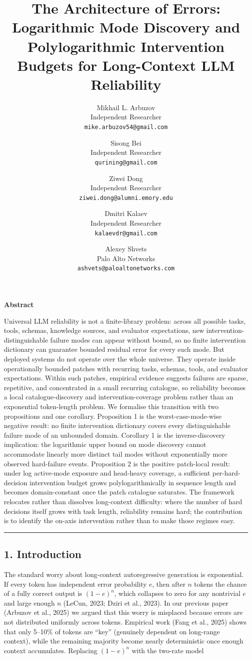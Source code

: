 \documentclass[
]{article}
\author{%
    Mikhail L. Arbuzov\\
    Independent Researcher\\
    \texttt{mike.arbuzov54@gmail.com}
    \and
    Sisong Bei\\
    Independent Researcher\\
    \texttt{qurining@gmail.com}
    \and
    Ziwei Dong\\
    Independent Researcher\\
    \texttt{ziwei.dong@alumni.emory.edu}
    \and
    Dmitri Kalaev\\
    Independent Researcher\\
    \texttt{kalaevdr@gmail.com}
    \and
    Alexey Shvets\\
    Palo Alto Networks\\
    \texttt{ashvets@paloaltonetworks.com}
  }%
\title{The Architecture of Errors: Logarithmic Mode Discovery and
Polylogarithmic Intervention Budgets for Long-Context LLM Reliability}
\author{}
\date{}
\begin{document}
\maketitle

\textbf{Abstract}

Universal LLM reliability is not a finite-library problem: across all
possible tasks, tools, schemas, knowledge sources, and evaluator
expectations, new intervention-distinguishable failure modes can appear
without bound, so no finite intervention dictionary can guarantee
bounded residual error for every such mode. But deployed systems do not
operate over the whole universe. They operate inside operationally
bounded patches with recurring tasks, schemas, tools, and evaluator
expectations. Within such patches, empirical evidence suggests failures
are sparse, repetitive, and concentrated in a small recurring catalogue,
so reliability becomes a local catalogue-discovery and
intervention-coverage problem rather than an exponential token-length
problem. We formalise this transition with two propositions and one
corollary. Proposition 1 is the worst-case-mode-wise negative result: no
finite intervention dictionary covers every distinguishable failure mode
of an unbounded domain. Corollary 1 is the inverse-discovery
implication: the logarithmic upper bound on mode discovery cannot
accommodate linearly more distinct tail modes without exponentially more
observed hard-failure events. Proposition 2 is the positive patch-local
result: under log active-mode exposure and head-heavy coverage, a
sufficient per-hard-decision intervention budget grows
polylogarithmically in sequence length and becomes domain-constant once
the patch catalogue saturates. The framework relocates rather than
dissolves long-context difficulty: where the number of hard decisions
itself grows with task length, reliability remains hard; the
contribution is to identify the on-axis intervention rather than to make
those regimes easy.

\begin{center}\rule{0.5\linewidth}{0.5pt}\end{center}

\subsection{1. Introduction}\label{introduction}

The standard worry about long-context autoregressive generation is
exponential. If every token has independent error probability \(e\),
then after \(n\) tokens the chance of a fully correct output is
\((1-e)^n\), which collapses to zero for any nontrivial \(e\) and large
enough \(n\) (LeCun, 2023; Dziri et al., 2023). In our previous paper
(Arbuzov et al., 2025) we argued that this worry is misplaced because
errors are not distributed uniformly across tokens. Empirical work (Fang
et al., 2025) shows that only 5--10\% of tokens are ``key'' (genuinely
dependent on long-range context), while the remaining majority become
nearly deterministic once enough context accumulates. Replacing
\((1-e)^n\) with the two-rate model
\end{document}
